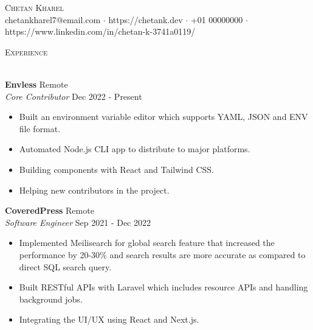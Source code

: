 \documentclass[a4paper]{article}
\newcommand{\lineunder} {
    \vspace*{-8pt} \\
    \hspace*{-18pt} \hrulefill \\
}
\newcommand{\header} [1] {
    {\hspace*{-18pt}\vspace*{6pt} \textsc{#1}}
    \vspace*{-6pt} \lineunder
}
\begin{document}
\vspace*{-40pt}

    

\vspace*{-10pt}
\begin{center}
	{\Huge \scshape {Chetan Kharel}}\\
	chetankharel7@email.com $\cdot$ https://chetank.dev $\cdot$ +01 00000000 $\cdot$ https://www.linkedin.com/in/chetan-k-3741a0119/\\
\end{center}


\header{Experience}
\vspace{1mm}

\textbf{Envless} \hfill Remote\\
\textit{Core Contributor} \hfill Dec 2022 - Present\\
\vspace{-1mm}
\begin{itemize} \itemsep 1pt
	\item Built an environment variable editor which supports YAML, JSON and ENV file format.
	\item Automated Node.js CLI app to distribute to major platforms.
	\item Building components with React and Tailwind CSS.
	\item Helping new contributors in the project.
\end{itemize}

\textbf{CoveredPress} \hfill Remote\\
\textit{Software Engineer} \hfill Sep 2021 - Dec 2022\\
\vspace{-1mm}
\begin{itemize} \itemsep 1pt
	\item Implemented Meilisearch for global search feature that increased the performance by 20-30\% and search results are more accurate as compared to direct SQL search query.
	\item Built RESTful APIs with Laravel which includes resource APIs and handling background jobs.
	\item Integrating the UI/UX using React and Next.js.
\end{itemize}
\end{document}
